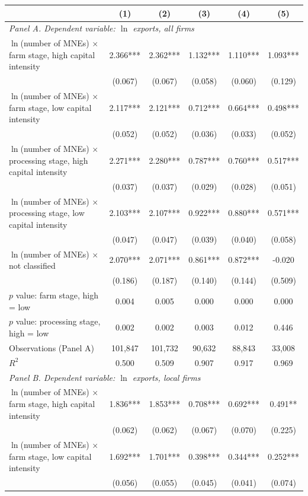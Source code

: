 \begin{tabular}{l*{5}{c}}
\toprule
 & (1) & (2) & (3) & (4) & (5) \\
\midrule
\multicolumn{6}{l}{\textit{Panel A. Dependent variable: $\ln$ exports, all firms}} \\
$\ln$(number of MNEs) $\times$ farm stage, high capital intensity & 2.366*** & 2.362*** & 1.132*** & 1.110*** & 1.093*** \\
 & (0.067) & (0.067) & (0.058) & (0.060) & (0.129) \\
$\ln$(number of MNEs) $\times$ farm stage, low capital intensity & 2.117*** & 2.121*** & 0.712*** & 0.664*** & 0.498*** \\
 & (0.052) & (0.052) & (0.036) & (0.033) & (0.052) \\
$\ln$(number of MNEs) $\times$ processing stage, high capital intensity & 2.271*** & 2.280*** & 0.787*** & 0.760*** & 0.517*** \\
 & (0.037) & (0.037) & (0.029) & (0.028) & (0.051) \\
$\ln$(number of MNEs) $\times$ processing stage, low capital intensity & 2.103*** & 2.107*** & 0.922*** & 0.880*** & 0.571*** \\
 & (0.047) & (0.047) & (0.039) & (0.040) & (0.058) \\
$\ln$(number of MNEs) $\times$ not classified & 2.070*** & 2.071*** & 0.861*** & 0.872*** & -0.020 \\
 & (0.186) & (0.187) & (0.140) & (0.144) & (0.509) \\
$p$ value: farm stage, high = low & 0.004 & 0.005 & 0.000 & 0.000 & 0.000 \\
$p$ value: processing stage, high = low & 0.002 & 0.002 & 0.003 & 0.012 & 0.446 \\
Observations (Panel A) & 101,847 & 101,732 & 90,632 & 88,843 & 33,008 \\
$R^2$ & 0.500 & 0.509 & 0.907 & 0.917 & 0.969 \\
\midrule
\multicolumn{6}{l}{\textit{Panel B. Dependent variable: $\ln$ exports, local firms}} \\
$\ln$(number of MNEs) $\times$ farm stage, high capital intensity & 1.836*** & 1.853*** & 0.708*** & 0.692*** & 0.491** \\
 & (0.062) & (0.062) & (0.067) & (0.070) & (0.225) \\
$\ln$(number of MNEs) $\times$ farm stage, low capital intensity & 1.692*** & 1.701*** & 0.398*** & 0.344*** & 0.252*** \\
 & (0.056) & (0.055) & (0.045) & (0.041) & (0.074) \\

\end{tabular}
